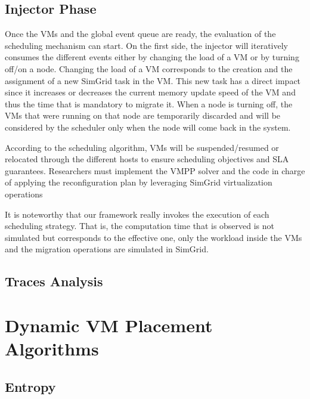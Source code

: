 \documentclass[conference]{IEEEtran}
\newcommand{\sg}{SimGrid\xspace}
\begin{document}
\subsection{Injector Phase}
Once the VMs and the global event queue are ready, the evaluation of the
scheduling mechanism can start. On the first side, the injector will iteratively
consumes the different events either by changing the load of a VM or
by turning off/on a node.
Changing the load of a VM corresponds to the
creation and the assignment of a new \sg task in the VM. This new task has
a direct impact since it increases or decreases the current memory
update speed of the VM and thus the time that is mandatory to migrate it.
When a node is turning off, the VMs that were running on that node are
temporarily discarded and will be considered by the scheduler only
when the node will come back in the system.

According to the scheduling algorithm, VMs will be suspended/resumed or
relocated through the
different hosts to ensure scheduling objectives and SLA guarantees.
Researchers must implement the VMPP solver and the code in charge of
applying the reconfiguration plan by leveraging \sg virtualization
operations

It is noteworthy that our framework really invokes the execution of
each scheduling strategy.  That is, the computation time that is observed
is not simulated but corresponds to the effective one, only the
workload inside the VMs and the migration operations are simulated in \sg.

\subsection{Traces Analysis}

\section{Dynamic VM Placement Algorithms}
\label{sec:vm-schedulers}
\subsection{Entropy}
\label{subsec:entropy}
\end{document}
